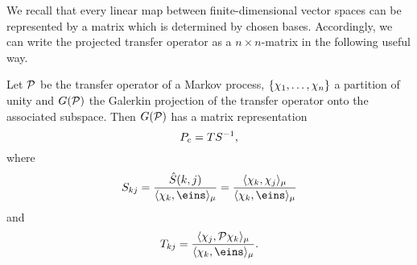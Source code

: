 We recall that every linear map between finite-dimensional vector spaces can be represented by a matrix which is determined by chosen bases.
Accordingly, we can write the projected transfer operator as a $n \times n$-matrix in the following useful way.

\begin{thm}
\label{thm:galerkin}
Let $\mathcal{P}$ be the transfer operator of a Markov process, $\{ \chi_1,\dots,\chi_n \}$ a partition of unity and $G(\mathcal{P})$ the Galerkin projection of the transfer operator onto the associated subspace.
Then $G(\mathcal{P})$ has a matrix representation
\begin{equation*}
P_c = T S^{-1},
\end{equation*}
where
\begin{equation}
\label{eq:massmatrix}
S_{kj} =  \frac{\hat{S}(k,j)}{\langle \chi_k, \eins \rangle_\mu}
= \frac{\langle \chi_k, \chi_j \rangle_\mu}{\langle \chi_k, \eins \rangle_\mu}
\end{equation}
and
\begin{equation*}
T_{kj} = \frac{\langle \chi_j, \Pcal \chi_k \rangle_\mu}{\langle \chi_k, \eins \rangle_\mu}.
\end{equation*}
\end{thm}

